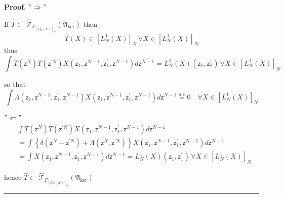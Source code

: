 \documentclass[aps,preprint]{revtex4}%
\newenvironment{proof}[1][Proof]{\noindent\textbf{#1.} }{\ \rule{0.5em}{0.5em}}
\begin{document}
\begin{proof}
$"\Rightarrow"$

If $\hat{T}\in$ $\mathcal{\hat{T}}_{F_{\left[  L_{N}^{1}\left(  X\right)
\right]  _{N}}}\left(  \mathfrak{A}_{\ker}\right)  $ then
\begin{equation}
\hat{T}\left(  X\right)  \in\left[  L_{N}^{1}\left(  X\right)  \right]
_{N}\,\forall X\in\left[  L_{N}^{1}\left(  X\right)  \right]  _{N}%
\end{equation}
thus
\begin{equation}%
{\displaystyle\int}
T\left(  \mathsf{z}^{N}\right)  T\left(  \mathsf{z}^{\prime N}\right)
X\left(  \mathsf{z}_{1},\mathsf{z}^{N-1},\mathsf{z}_{1}^{\prime}%
,\mathsf{z}^{N-1}\right)  d\mathsf{z}^{N-1}=L_{N}^{1}\left(  X\right)  \left(
\mathsf{z}_{1},\mathsf{z}_{1}^{\prime}\right)  \,\forall X\in\left[  L_{N}%
^{1}\left(  X\right)  \right]  _{N}%
\end{equation}


so that
\begin{equation}%
{\displaystyle\int}
\Lambda\left(  \mathsf{z}_{1},\mathsf{z}^{N-1},\mathsf{z}_{1}^{\prime
},\mathsf{z}^{N-1}\right)  X\left(  \mathsf{z}_{1},\mathsf{z}^{N-1}%
,\mathsf{z}_{1}^{\prime},\mathsf{z}^{N-1}\right)  d\mathsf{z}^{N-1}%
\overset{a.e}{=}0\quad\forall X\in\left[  L_{N}^{1}\left(  X\right)  \right]
_{N}%
\end{equation}


$"\Leftarrow"$%
\begin{align}
&
{\displaystyle\int}
T\left(  \mathsf{z}^{N}\right)  T\left(  \mathsf{z}^{\prime N}\right)
X\left(  \mathsf{z}_{1},\mathsf{z}^{N-1},\mathsf{z}_{1}^{\prime}%
,\mathsf{z}^{N-1}\right)  d\mathsf{z}^{N-1}\nonumber\\
&  \left.  =\right.
{\displaystyle\int}
\left\{  \delta\left(  \mathsf{z}^{N}-\mathsf{z}^{\prime N}\right)
+\Lambda\left(  \mathsf{z}^{N},\mathsf{z}^{\prime N}\right)  \right\}
X\left(  \mathsf{z}_{1},\mathsf{z}^{N-1},\mathsf{z}_{1}^{\prime}%
,\mathsf{z}^{N-1}\right)  d\mathsf{z}^{N-1}\nonumber\\
&  \left.  =\right.
{\displaystyle\int}
X\left(  \mathsf{z}_{1},\mathsf{z}^{N-1},\mathsf{z}_{1}^{\prime}%
,\mathsf{z}^{N-1}\right)  d\mathsf{z}^{N-1}\left.  =\right.  L_{N}^{1}\left(
X\right)  \left(  \mathsf{z}_{1},\mathsf{z}_{1}^{\prime}\right)  \,\forall
X\in\left[  L_{N}^{1}\left(  X\right)  \right]  _{N}%
\end{align}


hence $\hat{T}\in$ $\mathcal{\hat{T}}_{F_{\left[  L_{N}^{1}\left(  X\right)
\right]  _{N}}}\left(  \mathfrak{A}_{\ker}\right)  $
\end{proof}
\end{document}
